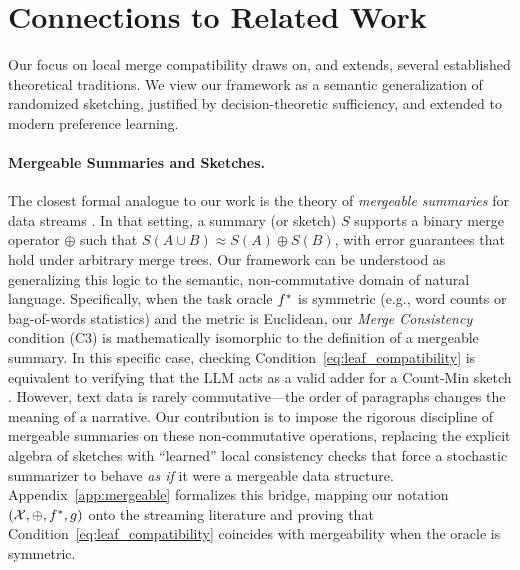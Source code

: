 \section{Connections to Related Work}\label{sec:related}

Our focus on local merge compatibility draws on, and extends, several established theoretical traditions. We view our framework as a semantic generalization of randomized sketching, justified by decision-theoretic sufficiency, and extended to modern preference learning.

\paragraph{Mergeable Summaries and Sketches.}
The closest formal analogue to our work is the theory of \emph{mergeable summaries} for data streams \citep{Agarwal2013MergeableTODS}. In that setting, a summary (or sketch) $S$ supports a binary merge operator $\oplus$ such that $S(A \cup B) \approx S(A) \oplus S(B)$, with error guarantees that hold under arbitrary merge trees.
Our framework can be understood as generalizing this logic to the semantic, non-commutative domain of natural language.
Specifically, when the task oracle $f^{\ast}$ is symmetric (e.g., word counts or bag-of-words statistics) and the metric is Euclidean, our \emph{Merge Consistency} condition (C3) is mathematically isomorphic to the definition of a mergeable summary. In this specific case, checking Condition~\eqref{eq:leaf_compatibility} is equivalent to verifying that the LLM acts as a valid adder for a Count-Min sketch \citep{CormodeMuthukrishnan2005}.
However, text data is rarely commutative---the order of paragraphs changes the meaning of a narrative. Our contribution is to impose the rigorous discipline of mergeable summaries on these non-commutative operations, replacing the explicit algebra of sketches with ``learned'' local consistency checks that force a stochastic summarizer to behave \emph{as if} it were a mergeable data structure.
Appendix~\ref{app:mergeable} formalizes this bridge, mapping our notation $(\mathcal{X},\oplus,f^{\ast},g)$ onto the streaming literature and proving that Condition~\eqref{eq:leaf_compatibility} coincides with mergeability when the oracle is symmetric.


